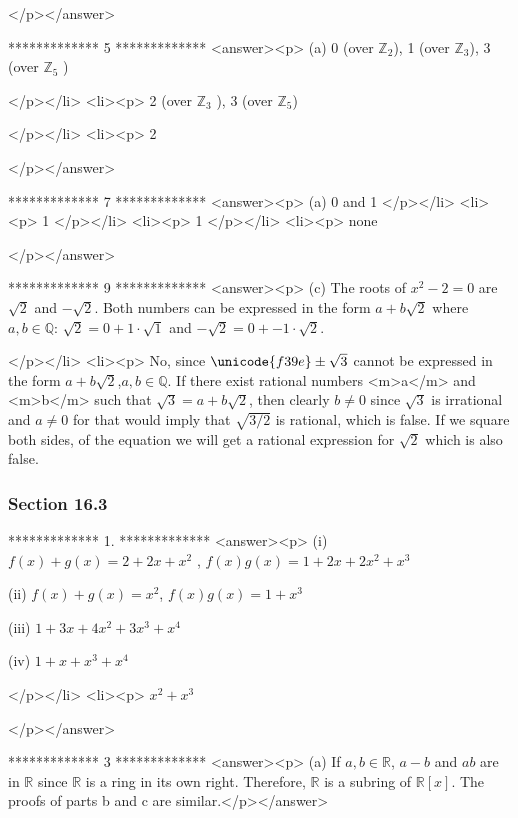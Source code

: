 </p></answer>


*************
5
*************
<answer><p> (a)  0  (over \(\mathbb{Z}_2\)),  1 (over \(\mathbb{Z}_3\)),  3 (over \(\mathbb{Z}_5\) )

</p></li>
<li><p> 2 (over \(\mathbb{Z}_3\) ),  3 (over \(\mathbb{Z}_5\))

</p></li>
<li><p> 2

</p></answer>


*************
7
*************
<answer><p> (a)  0 and 1 </p></li>
<li><p> 1 </p></li>
<li><p> 1 </p></li>
<li><p> none

</p></answer>


*************
9
*************
<answer><p> (c) The roots of \(x ^2 - 2 = 0\) are \(\sqrt{2}\) and \(-\sqrt{2}\). Both numbers can be expressed in the form \(a +b\sqrt{2}\) where \(a, b
\in  \mathbb{Q}\):  \(\sqrt{2} = 0 + 1 \cdot \sqrt{1}\) and \(-\sqrt{2}= 0 + -1 \cdot \sqrt{2}\).

</p></li>
<li><p> No, since \(\unicode{f39e}\pm \sqrt{3}\) cannot be expressed in the form \(a + b \sqrt{2}\),\(a, b \in  \mathbb{Q}\).  If there exist rational
numbers <m>a</m> and <m>b</m> such that \(\sqrt{3}= a + b \sqrt{2}\), then clearly \(b\neq 0\) since \(\sqrt{3}\) is irrational and \(a\neq
0\) for that would imply that \(\sqrt{3/2}\) is rational, which is false.   If we square both sides, of the equation we will get a rational expression
for \(\sqrt{2}\) which is also false.


\subsubsection{Section 16.3}

*************
1.
*************
<answer><p> (i) \(f(x) + g(x) = 2 + 2x + x^2\) ,   \(f(x)g(x) =1 +2x +2x^2+x^3\)



(ii) \(f(x)+g(x)=x^2\),      \(f(x)g(x) =1+x^3\)



(iii) \(1 + 3x + 4x ^2 + 3x^3 + x^4\)



(iv) \(1 + x + x^3 + x^4\)

</p></li>
<li><p>  \(x^2+ x^3\)

</p></answer>


*************
3
*************
<answer><p> (a) If \(a, b \in  \mathbb{R}\), \(a - b\) and \(a b\) are in $\mathbb{R}$ since $\mathbb{R}$ is a ring in its own right. Therefore, $\mathbb{R}$
is a subring of \(\mathbb{R}[x]\).  The proofs of parts b and c are similar.</p></answer>


